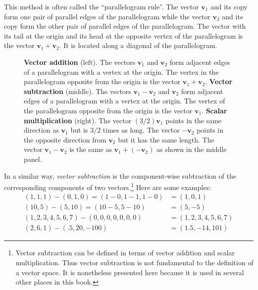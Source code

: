    This method is often called the ``parallelogram rule''. The vector 
$\mathbf{v}_1$ and its copy form one pair of parallel edges of the 
parallelogram while the vector $\mathbf{v}_2$ and its copy form the other pair 
of parallel edges of the parallelogram. The vector with its tail at the origin 
and its head at the opposite vertex of the parallelogram is the vector 
$\mathbf{v}_1 + \mathbf{v}_2$. It is located along a diagonal of the 
parallelogram. 


\begin{figure}[h]
\centering
\caption[Scott Hotton]{{\bf Vector addition} (left). The vectors $\mathbf{v}_1$ 
and $\mathbf{v}_2$ form adjacent edges of a parallelogram with a vertex at the
origin. The vertex in the parallelogram opposite from the origin is the 
vector $\mathbf{v}_1 + \mathbf{v}_2$. {\bf Vector subtraction} (middle). The 
vectors $\mathbf{v}_1 - \mathbf{v}_2$ and $\mathbf{v}_2$ form adjacent edges of
a parallelogram with a vertex at the origin. The vertex of the parallelogram 
opposite from the origin is the vector $\mathbf{v}_1$. {\bf Scalar 
multiplication} (right). The vector $(3/2)\mathbf{v}_1$ points in the same
direction as $\mathbf{v}_1$ but is $3/2$ times as long. The vector 
$-\mathbf{v}_2$ points in the opposite direction from $\mathbf{v}_2$ but
it has the same length. The vector $\mathbf{v}_1 - \mathbf{v}_2$ is the
same as $\mathbf{v}_1 + (-\mathbf{v}_2)$ as shown in the middle panel.}
\label{vectorMath}
\end{figure}

   In a similar way, \emph{vector subtraction} is the component-wise 
subtraction of the corresponding components of two vectors.\footnote{Vector 
subtraction can be defined in terms of vector addition and scalar 
multiplication. Thus vector subtraction is not fundamental to the definition 
of a vector space. It is nonetheless presented here because it is used in 
several other places in this book.}  Here are some examples:
\begin{align*}
(1,1,1) - (0,1,0) = (1-0,1-1,1-0) &= (1,0,1) \\
(10,5) - (5,10) = (10-5,5-10) &= (5,-5) \\
(1,2,3,4,5,6,7) - (0,0,0,0,0,0,0) &= (1,2,3,4,5,6,7) \\
(2,6,1) - (.5,20,-100) &= (1.5,-14,101)
\end{align*}

